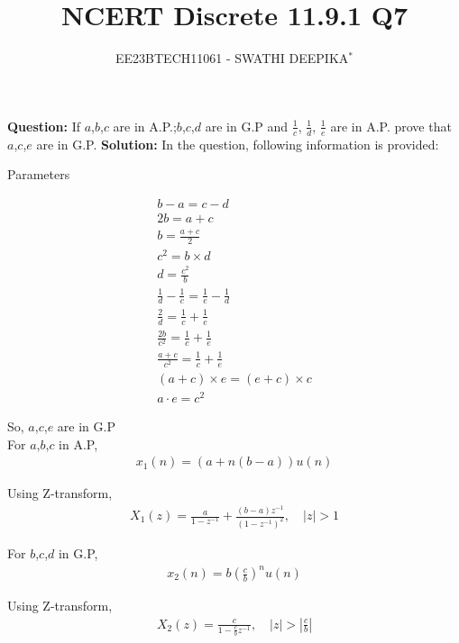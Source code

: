 \documentclass[journal,12pt,twocolumn]{IEEEtran}
\title{
	
\title{NCERT Discrete 11.9.1 Q7}
\author{EE23BTECH11061 - SWATHI DEEPIKA$^{*}$%
}


}
\providecommand{\brak}[1]{\ensuremath{\left(#1\right)}}
\theoremstyle{remark}
\providecommand{\abs}[1]{\left\vert#1\right\vert}
\newcommand{\solution}{\noindent \textbf{Solution: }}
\begin{document}
\maketitle

\textbf{Question:} 
If $a$,$b$,$c$ are in A.P.;$b$,$c$,$d$ are in G.P and $\frac{1}{c}$, $\frac{1}{d}$, $\frac{1}{e}$ are in A.P. prove that $a$,$c$,$e$ are in G.P.
\solution
In the question, following information is provided:
 \begin{table}[h]
 	\centering
 	\resizebox{6 cm}{!}{
 		
 	}
 	\vspace{6 pt}
 	\caption{Parameters}
 	\label{tab:swa_tabel} 
 \end{table}

 
\begin{align}
b-a = c-d\\
2b=a+c\\
b=\frac{a+c}{2}\\
c^2 = b\times d\\
d= \frac{c^2}{b}\\
\frac{1}{d} - \frac{1}{c} = \frac{1}{e} - \frac{1}{d}\\
\frac{2}{d} = \frac{1}{c} + \frac{1}{e}\\
\frac{2b}{c^2} = \frac{1}{c} + \frac{1}{e}\\
\frac{a+c}{c^2} = \frac{1}{c} + \frac{1}{e}\\
(a+c)\times e = (e+c)\times c\\
a \cdot e = c^2
\end{align}

So, $a$,$c$,$e$ are in G.P\\


For $a$,$b$,$c$ in A.P,
\begin{align}
x_1(n) = (a + n(b-a))u(n)
\end{align}

Using Z-transform, 
\begin{align}
X_1(z) = \frac{a}{1-z^{-1}} + \frac{(b-a)z^{-1}}{(1-z^{-1})^2} ,
\quad |z| > 1
\end{align}

For $b$,$c$,$d$ in G.P,
\begin{align}
x_2(n) = b\brak{\frac{c}{b}}^n u(n)
\end{align}

Using Z-transform,
\begin{align}
X_2(z) = \frac{c}{1-\frac{c}{b}z^{-1}},  \quad \abs{z}>\abs{\frac{c}{b}}
\end{align}
\end{document}
